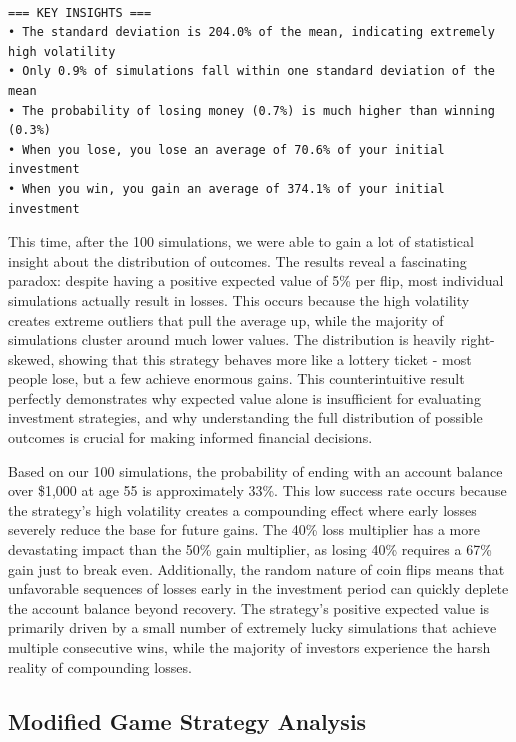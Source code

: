 \documentclass[
  letterpaper,
  DIV=11,
  numbers=noendperiod]{scrartcl}
\begin{document}
\begin{verbatim}

=== KEY INSIGHTS ===
• The standard deviation is 204.0% of the mean, indicating extremely high volatility
• Only 0.9% of simulations fall within one standard deviation of the mean
• The probability of losing money (0.7%) is much higher than winning (0.3%)
• When you lose, you lose an average of 70.6% of your initial investment
• When you win, you gain an average of 374.1% of your initial investment
\end{verbatim}

This time, after the 100 simulations, we were able to gain a lot of
statistical insight about the distribution of outcomes. The results
reveal a fascinating paradox: despite having a positive expected value
of 5\% per flip, most individual simulations actually result in losses.
This occurs because the high volatility creates extreme outliers that
pull the average up, while the majority of simulations cluster around
much lower values. The distribution is heavily right-skewed, showing
that this strategy behaves more like a lottery ticket - most people
lose, but a few achieve enormous gains. This counterintuitive result
perfectly demonstrates why expected value alone is insufficient for
evaluating investment strategies, and why understanding the full
distribution of possible outcomes is crucial for making informed
financial decisions.

Based on our 100 simulations, the probability of ending with an account
balance over \$1,000 at age 55 is approximately 33\%. This low success
rate occurs because the strategy's high volatility creates a compounding
effect where early losses severely reduce the base for future gains. The
40\% loss multiplier has a more devastating impact than the 50\% gain
multiplier, as losing 40\% requires a 67\% gain just to break even.
Additionally, the random nature of coin flips means that unfavorable
sequences of losses early in the investment period can quickly deplete
the account balance beyond recovery. The strategy's positive expected
value is primarily driven by a small number of extremely lucky
simulations that achieve multiple consecutive wins, while the majority
of investors experience the harsh reality of compounding losses.

\subsection{Modified Game Strategy
Analysis}\label{modified-game-strategy-analysis}
\end{document}
